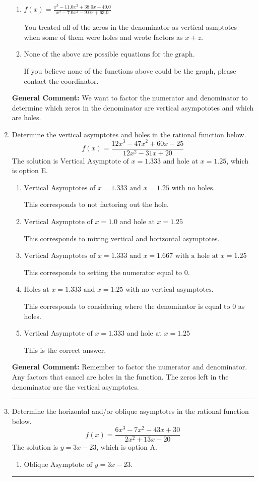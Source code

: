 \documentclass{extbook}[14pt]
\newcommand{\litem}[1]{\item #1

\rule{\textwidth}{0.4pt}}
\begin{document}
\begin{enumerate}
{\begin{enumerate}[label=\Alph*.]
This is the correct answer!
\item \( f(x)=\frac{x^{3} -11.0 x^{2} +38.0 x -40.0}{x^{3} -7.0 x^{2} -9.0 x + 63.0} \)

You treated all of the zeros in the denominator as vertical asmptotes when some of them were holes and wrote factors as $x+z$.
\item \( \text{None of the above are possible equations for the graph.} \)

If you believe none of the functions above could be the graph, please contact the coordinator.
\end{enumerate}

\textbf{General Comment:} We want to factor the numerator and denominator to determine which zeros in the denominator are vertical asympototes and which are holes.
}
\litem{
Determine the vertical asymptotes and holes in the rational function below.
\[ f(x) = \frac{12x^{3} -47 x^{2} +60 x -25}{12x^{2} -31 x + 20} \]The solution is \( \text{Vertical Asymptote of } x = 1.333 \text{ and hole at } x = 1.25 \), which is option E.\begin{enumerate}[label=\Alph*.]
\item \( \text{Vertical Asymptotes of } x = 1.333 \text{ and } x = 1.25 \text{ with no holes.} \)

This corresponds to not factoring out the hole.
\item \( \text{Vertical Asymptote of } x = 1.0 \text{ and hole at } x = 1.25 \)

This corresponds to mixing vertical and horizontal asymptotes.
\item \( \text{Vertical Asymptotes of } x = 1.333 \text{ and } x = 1.667 \text{ with a hole at } x = 1.25 \)

This corresponds to setting the numerator equal to 0.
\item \( \text{Holes at } x = 1.333 \text{ and } x = 1.25 \text{ with no vertical asymptotes.} \)

This corresponds to considering where the denominator is equal to 0 as holes.
\item \( \text{Vertical Asymptote of } x = 1.333 \text{ and hole at } x = 1.25 \)

This is the correct answer.
\end{enumerate}

\textbf{General Comment:} Remember to factor the numerator and denominator. Any factors that cancel are holes in the function. The zeros left in the denominator are the vertical asymptotes.
}
\litem{
Determine the horizontal and/or oblique asymptotes in the rational function below.
\[ f(x) = \frac{6x^{3} -7 x^{2} -43 x + 30}{2x^{2} +13 x + 20} \]The solution is \( y = 3x -23 \), which is option A.\begin{enumerate}[label=\Alph*.]
\item \( \text{Oblique Asymptote of } y = 3x -23. \)


\end{enumerate}}
\end{enumerate}
\end{document}
